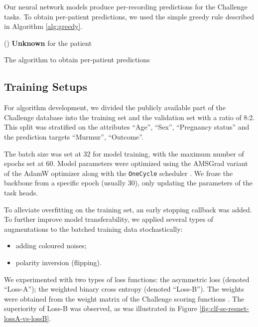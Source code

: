 

Our neural network models produce per-recording predictions for the Challenge tasks. To obtain per-patient predictions, we used the simple greedy rule described in Algorithm \ref{alg:greedy}.

\begin{algorithm}
\SetInd{0.2em}{2em}
\Else(){
    \textbf{Unknown} for the patient\;
}
\caption{The algorithm to obtain per-patient predictions}\label{alg:greedy}
\end{algorithm}

\subsection{Training Setups}
\label{subsec:training}

For algorithm development, we divided the publicly available part of the Challenge database into the training set and the validation set with a ratio of 8:2. This split was stratified on the attributes ``Age'', ``Sex'', ``Pregnancy status'' and the prediction targets ``Murmur'', ``Outcome''.

The batch size was set at 32 for model training, with the maximum number of epochs set at 60. Model parameters were optimized using the AMSGrad variant of the AdamW optimizer \cite{adamw_amsgrad} along with the \texttt{OneCycle} scheduler \cite{smith2019one_cycle}. We froze the backbone from a specific epoch (usually 30), only updating the parameters of the task heads.

To alleviate overfitting on the training set, an early stopping callback was added. To further improve model transferability, we applied several types of augmentations to the batched training data stochastically:
\begin{itemize}
    \item adding coloured noises;
    \item polarity inversion (flipping).
\end{itemize}

We experimented with two types of loss functions: the asymmetric loss (denoted ``Loss-A''); the weighted binary cross entropy (denoted ``Loss-B''). The weights were obtained from the weight matrix of the Challenge scoring functions \cite{cinc2022}. The superiority of Loss-B was observed, as was illustrated in Figure \ref{fig:clf-se-resnet-lossA-vs-lossB}.

